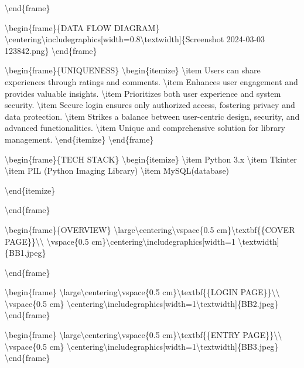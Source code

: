 \textbackslash end\{frame\}

\textbackslash begin\{frame\}\{DATA FLOW DIAGRAM\}
\textbackslash centering\textbackslash includegraphics{[}width=0.8\textbackslash textwidth{]}\{Screenshot
2024-03-03 123842.png\} \textbackslash end\{frame\}

\textbackslash begin\{frame\}\{UNIQUENESS\}
\textbackslash begin\{itemize\} \textbackslash item Users can share
experiences through ratings and comments. \textbackslash item Enhances
user engagement and provides valuable insights. \textbackslash item
Prioritizes both user experience and system security.
\textbackslash item Secure login ensures only authorized access,
fostering privacy and data protection. \textbackslash item Strikes a
balance between user-centric design, security, and advanced
functionalities. \textbackslash item Unique and comprehensive solution
for library management. \textbackslash end\{itemize\}
\textbackslash end\{frame\}

\textbackslash begin\{frame\}\{TECH STACK\}
\textbackslash begin\{itemize\} \textbackslash item Python 3.x
\textbackslash item Tkinter \textbackslash item PIL (Python Imaging
Library) \textbackslash item MySQL(database)

\textbackslash end\{itemize\}

\textbackslash end\{frame\}

\textbackslash begin\{frame\}\{OVERVIEW\}
\textbackslash large\textbackslash centering\textbackslash vspace\{0.5
cm\}\textbackslash textbf\{\{COVER
PAGE\}\}\textbackslash\textbackslash{} \textbackslash vspace\{0.5
cm\}\textbackslash centering\textbackslash includegraphics{[}width=1
\textbackslash textwidth{]}\{BB1.jpeg\}

\textbackslash end\{frame\}

\textbackslash begin\{frame\}
\textbackslash large\textbackslash centering\textbackslash vspace\{0.5
cm\}\textbackslash textbf\{\{LOGIN
PAGE\}\}\textbackslash\textbackslash{} \textbackslash vspace\{0.5 cm\}
\textbackslash centering\textbackslash includegraphics{[}width=1\textbackslash textwidth{]}\{BB2.jpeg\}
\textbackslash end\{frame\}

\textbackslash begin\{frame\}
\textbackslash large\textbackslash centering\textbackslash vspace\{0.5
cm\}\textbackslash textbf\{\{ENTRY
PAGE\}\}\textbackslash\textbackslash{} \textbackslash vspace\{0.5 cm\}
\textbackslash centering\textbackslash includegraphics{[}width=1\textbackslash textwidth{]}\{BB3.jpeg\}
\textbackslash end\{frame\}

